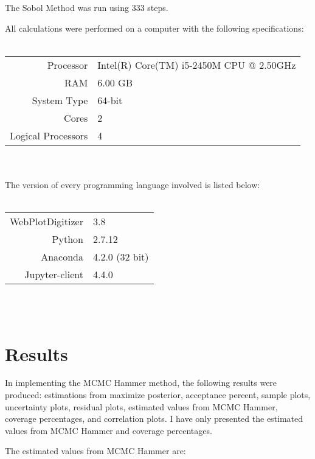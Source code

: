 \documentclass[12pt]{article}
\begin{document}
The Sobol Method was run using 333 steps.

All calculations were performed on a computer with the following specifications:\\
\\
\begin{tabular}{r|l}
Processor& Intel(R) Core(TM) i5-2450M CPU @ 2.50GHz\\
RAM& 6.00 GB \\
System Type& 64-bit\\
Cores& 2\\
Logical Processors& 4\\
\end{tabular}
\\
\\
The version of every programming language involved is listed below:
\\ \\
\begin{tabular}{r|l}
WebPlotDigitizer& 3.8\\
Python& 2.7.12\\
Anaconda& 4.2.0 (32 bit)\\
Jupyter-client&  4.4.0
\end{tabular}
\\ \\

\section*{Results}

In implementing the MCMC Hammer method, the following results were produced: estimations from maximize posterior, acceptance percent, sample plots, uncertainty plots, residual plots, estimated values from MCMC Hammer, coverage percentages, and correlation plots. I have only presented the estimated values from MCMC Hammer and coverage percentages.

The estimated values from MCMC Hammer \cite{emcee} are:
\end{document}
